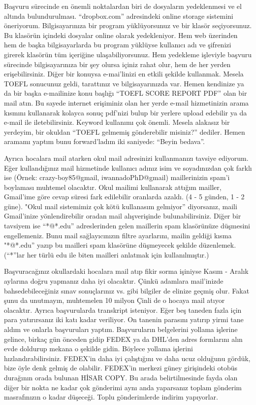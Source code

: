 \documentclass[12pt]{article}
\begin{document}
Başvuru sürecinde en önemli noktalardan biri de dosyaların yedeklenmesi ve el altında bulundurulması. “dropbox.com” adresindeki online storage sistemini öneriyorum. Bilgisayarınıza bir program yüklüyorsunuz ve bir klasör seçiyorsunuz. Bu klasörün içindeki dosyalar online olarak yedekleniyor. Hem web üzerinden hem de başka bilgisayarlarda bu program yüklüyse kullanıcı adı ve şifrenizi girerek klasörün tüm içeriğine ulaşabiliyorsunuz.  Hem yedekleme işleviyle başvuru sürecinde bilgisayarınıza bir şey olursa içiniz rahat olur, hem de her yerden erişebilirsiniz. Diğer bir konuysa e-mai’linizi en etkili şekilde kullanmak. Mesela TOEFL sonucunuz geldi, tarattınız ve bilgisayarınızda var. Hemen kendinize ya da bir başka e-mailinize konu başlığı “TOEFL SCORE REPORT PDF” olan bir mail atın. Bu sayede internet erişiminiz olan her yerde e-mail hizmetinizin arama kısmını kullanarak kolayca sonuç pdf’nizi bulup bir yerlere upload edebilir ya da e-mail ile iletebilirsiniz. Keyword kullanımı çok önemli. Mesela alakasız bir yerdeyim, bir okuldan “TOEFL gelmemiş gönderebilir misiniz?” dediler. Hemen aramamı yaptım bunu forward’ladım iki saniyede: “Beyin bedava”.


Ayrıca hocalara mail atarken okul mail adresinizi kullanmanızı tavsiye ediyorum. Eğer kullandığınız mail hizmetinde kullanıcı adınız isim ve soyadınızdan çok farklı ise (Örnek: crazy-boy85@gmail, iwannadoPhD@gmail) maillerinizin spam’i boylaması muhtemel olacaktır. Okul mailimi kullanarak attığım mailler, Gmail’ime göre cevap süresi fark edilebilir oranlarda azaldı. (4 - 5 günden, 1 - 2 güne). "Okul mail sistemimiz çok kötü kullanasım gelmiyor” diyorsanız, maili Gmail’inize yönlendirebilir oradan mail alışverişinde bulunabilirsiniz. Diğer bir tavsiyem ise ``*@*.edu'' adreslerinden gelen maillerin spam klasörünüze düşmesini engellemeniz. Bunu mail sağlayıcınızın filtre ayarlarını, mailin geldiği kısma "*@*.edu” yazıp bu mailleri spam klasörüne düşmeyecek şekilde düzenlemek. (``*''lar her türlü edu ile biten mailleri anlatmak için kullanılmıştır.)

Başvuracağınız okullardaki hocalara mail atıp fikir sorma işiniyse Kasım - Aralık aylarına doğru yapmanız daha iyi olacaktır. Çünkü adamlara mail’inizde bahsedebileceğiniz sınav sonuçlarınız vs. gibi bilgiler de elinize geçmiş olur. Fakat şunu da unutmayın, muhtemelen 10 milyon Çinli de o hocaya mail atıyor olacaktır. Ayrıca başvurularda transkript isteniyor. Eğer beş taneden fazla için para yatırırsanız iki katı kadar veriliyor. On tanenin parasını yatırıp yirmi tane aldım ve onlarla başvuruları yaptım. Başvuruların belgelerini yollama işlerine gelince, birkaç gün önceden gidip FEDEX ya da DHL’den adres formlarını alın evde doldurup mekana o şekilde gidin. Böylece yollama işlerini hızlandırabilirsiniz. FEDEX’in daha iyi çalıştığını ve daha ucuz olduğunu gördük, bize öyle denk gelmiş de olabilir. FEDEX’in merkezi güney girişindeki otobüs durağının orada bulunan HİSAR COPY. Bu arada belirtilmesinde fayda olan diğer bir nokta ne kadar çok gönderimi aynı anda yaparsanız toplam gönderim masrafınızın o kadar düşeceği. Toplu gönderimlerde indirim yapıyorlar.
\end{document}
